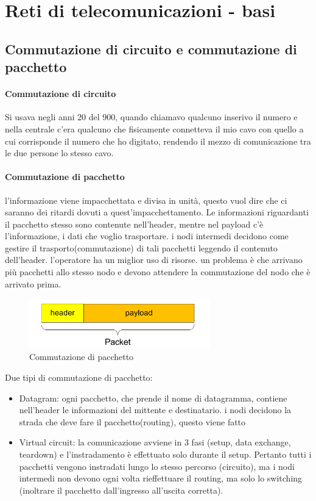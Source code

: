 \section{Reti di telecomunicazioni - basi}
\subsection{Commutazione di circuito e commutazione di pacchetto}
\paragraph{Commutazione di circuito}
Si usava negli anni 20 del 900, quando chiamavo qualcuno inserivo il numero e nella centrale c’era qualcuno che fisicamente connetteva il mio cavo con quello a cui corrisponde il numero che ho digitato, rendendo il mezzo di comunicazione tra le due persone lo stesso cavo.
\paragraph{Commutazione di pacchetto} 
l'informazione viene impacchettata e divisa in unità, questo vuol dire che ci saranno dei ritardi dovuti a quest'impacchettamento. Le informazioni riguardanti il pacchetto stesso sono contenute nell'header, mentre nel payload c'è l'informazione, i dati che voglio trasportare. 
i nodi intermedi decidono come gestire il trasporto(commutazione) di tali pacchetti leggendo il contenuto dell’header. l’operatore ha un miglior uso di risorse.
un problema è che arrivano più pacchetti allo stesso nodo e devono attendere la commutazione del nodo che è arrivato prima.

\begin{figure}[h!]
    \centering
    \includegraphics[width=0.7\textwidth]{images/pacchetto_generico.png}
    \caption{Commutazione di pacchetto}
    \label{fig:commutazione_pacchetto}
\end{figure}

Due tipi di commutazione di pacchetto: 
\begin{itemize}
    \item Datagram: ogni pacchetto, che prende il nome di datagramma, contiene nell’header le informazioni del mittente e destinatario. i nodi decidono la strada che deve fare il pacchetto(routing), questo viene fatto
    \item Virtual circuit: la comunicazione avviene in 3 fasi (setup, data
exchange, teardown) e l'instradamento è effettuato solo durante il setup.
Pertanto tutti i pacchetti vengono instradati lungo lo stesso percorso
(circuito), ma i nodi intermedi non devono ogni volta rieffettuare il routing,
ma solo lo switching (inoltrare il pacchetto dall'ingresso all'uscita corretta).
\end{itemize}
\newpage
